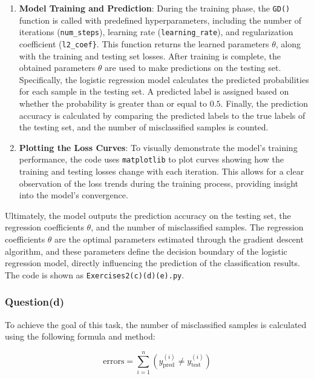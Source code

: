 \documentclass[a4paper, utf8]{ctexart}
\begin{document}
\begin{enumerate}[itemsep=2pt, topsep=0pt, parsep=0pt]
		\item \textbf{Model Training and Prediction}: During the training phase, the \verb|GD()| function is called with predefined hyperparameters, including the number of iterations (\verb|num_steps|), learning rate (\verb|learning_rate|), and regularization coefficient (\verb|l2_coef}|. This function returns the learned parameters $\theta$, along with the training and testing set losses. After training is complete, the obtained parameters $\theta$ are used to make predictions on the testing set. Specifically, the logistic regression model calculates the predicted probabilities for each sample in the testing set. A predicted label is assigned based on whether the probability is greater than or equal to $0.5$. Finally, the prediction accuracy is calculated by comparing the predicted labels to the true labels of the testing set, and the number of misclassified samples is counted.
		
		\item \textbf{Plotting the Loss Curves}: To visually demonstrate the model's training performance, the code uses \verb|matplotlib| to plot curves showing how the training and testing losses change with each iteration. This allows for a clear observation of the loss trends during the training process, providing insight into the model's convergence.
	\end{enumerate}
	
	Ultimately, the model outputs the prediction accuracy on the testing set, the regression coefficients $\theta$, and the number of misclassified samples. The regression coefficients $\theta$ are the optimal parameters estimated through the gradient descent algorithm, and these parameters define the decision boundary of the logistic regression model, directly influencing the prediction of the classification results. The code is shown as \verb|Exercises2(c)(d)(e).py|.
	
	\subsubsection{Question(d)}
	
	To achieve the goal of this task, the number of misclassified samples is calculated using the following formula and method:
	
	\vspace{-.5em}
	\begin{equation}
		\text{errors} = \sum_{i=1}^{n} \left( y_{\text{pred}}^{(i)} \neq y_{\text{test}}^{(i)} \right)
		\nonumber
	\end{equation}
	
\end{document}
